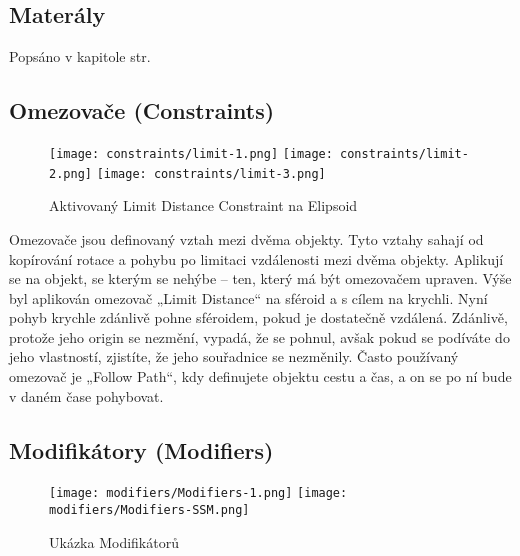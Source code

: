 \documentclass[12pt,a4paper]{report}
\begin{document}
	\subsection{Materály}
	Popsáno v kapitole  str. \pageref{section:materials}
	
	\subsection{Omezovače (Constraints)}
	
	\begin{figure}[h]
		\centering
		\texttt{[image: constraints/limit-1.png]}
		\texttt{[image: constraints/limit-2.png]}
		\texttt{[image: constraints/limit-3.png]}
		\caption{Aktivovaný Limit Distance Constraint na Elipsoid}
		\label{pic:constraints}
	\end{figure}

	Omezovače jsou definovaný vztah mezi dvěma objekty.
	Tyto vztahy sahají od kopírování rotace a pohybu po limitaci vzdálenosti
	mezi dvěma objekty. Aplikují se na objekt, se kterým se nehýbe – ten,
	který má být omezovačem upraven. Výše byl aplikován omezovač „Limit
	Distance“ na sféroid a s cílem na krychli. Nyní pohyb krychle zdánlivě
	pohne sféroidem, pokud je dostatečně vzdálená. Zdánlivě, protože jeho
	origin se nezmění, vypadá, že se pohnul, avšak pokud se podíváte do jeho
	vlastností, zjistíte, že jeho souřadnice se nezměnily.
	Často používaný omezovač je „Follow Path“, kdy definujete objektu cestu
	a čas, a on se po ní bude v daném čase pohybovat.
	
	\subsection{Modifikátory (Modifiers)}
	
	\begin{figure}[h]
		\centering
		\texttt{[image: modifiers/Modifiers-1.png]}
		\texttt{[image: modifiers/Modifiers-SSM.png]}
		\caption{Ukázka Modifikátorů}
		\label{pic:modifiers}
	\end{figure}
	
\end{document}
